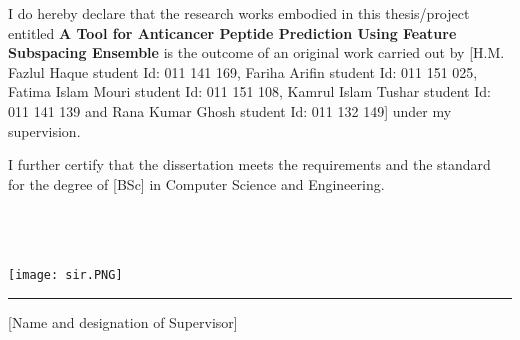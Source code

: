 \begin{certificate} 
I do hereby declare that the research works embodied in this thesis/project entitled \textbf{A Tool for Anticancer Peptide Prediction Using Feature Subspacing Ensemble} is the outcome of an original work carried out by [H.M. Fazlul Haque student Id: 011 141 169, Fariha Arifin student Id: 011 151 025, Fatima Islam Mouri student Id: 011 151 108, Kamrul Islam Tushar student Id: 011 141 139 and Rana Kumar Ghosh student Id: 011 132 149] under my supervision.

I further certify that the dissertation meets the requirements and the standard for the degree of [BSc] in Computer Science and Engineering.
\\
\\
\\
\\

\begin{minipage}[b]{0.4\textwidth}
    \texttt{[image: sir.PNG]}
    \rule{1.6\textwidth}{.4pt}
  \end{minipage}

[Name and designation of Supervisor]\\


\end{certificate}
